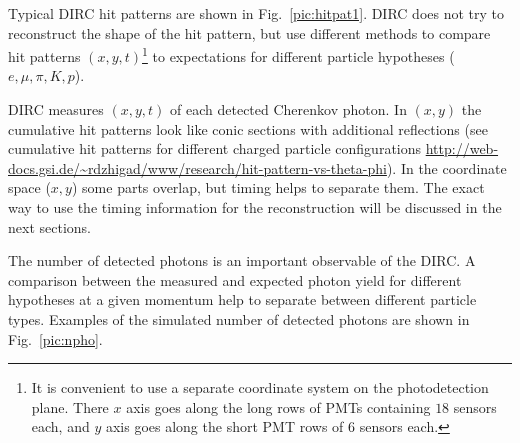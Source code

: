 Typical \gluex DIRC hit patterns are shown in Fig.~\ref{pic:hitpat1}. DIRC does not try to reconstruct the shape of the hit pattern, but use different methods to compare hit patterns $(x,y,t)$\footnote{It is convenient to use a separate coordinate system on the photodetection plane. There $x$ axis goes along the long rows of PMTs containing $18$ sensors each, and $y$ axis goes along the short PMT rows of $6$ sensors each.} to expectations for different particle hypotheses ($e, \mu, \pi, K, p$).


DIRC measures $(x,y,t)$ of each detected Cherenkov photon. In $(x,y)$ the cumulative hit patterns look like conic sections with additional reflections (see cumulative hit patterns for different charged particle configurations \url{http://web-docs.gsi.de/~rdzhigad/www/research/hit-pattern-vs-theta-phi}). In the coordinate space ($x ,y$) some parts overlap, but timing helps to separate them.
The exact way to use the timing information for the reconstruction will be discussed in the next sections.

The number of detected photons is an important observable of the DIRC. A comparison between the measured and expected photon yield for different hypotheses at a given momentum help to separate between different particle types. Examples of the simulated number of detected photons are shown in Fig.~\ref{pic:npho}.

